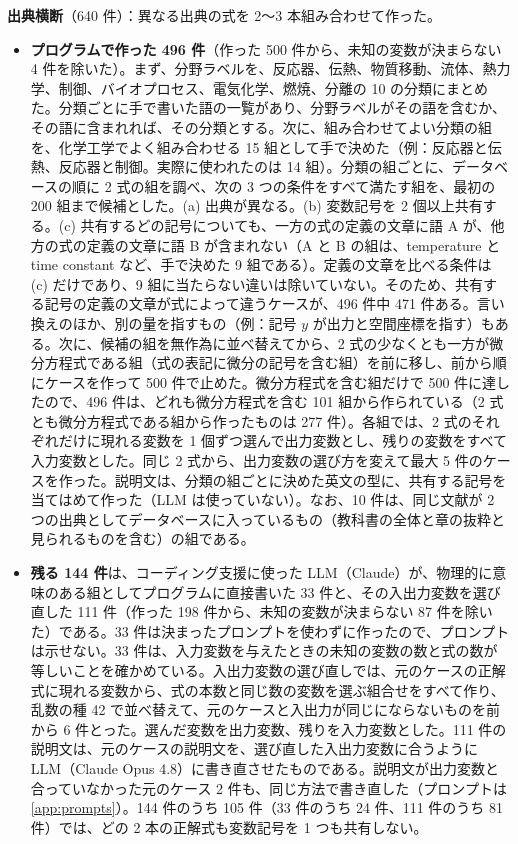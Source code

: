 \documentclass[11pt,a4paper]{ltjsarticle}
\begin{document}
\textbf{出典横断}（640 件）：異なる出典の式を 2〜3 本組み合わせて作った。
\begin{itemize}[leftmargin=1.5em]
  \item \textbf{プログラムで作った 496 件}（作った 500 件から、未知の変数が決まらない 4 件を除いた）。まず、分野ラベルを、反応器、伝熱、物質移動、流体、熱力学、制御、バイオプロセス、電気化学、燃焼、分離の 10 の分類にまとめた。分類ごとに手で書いた語の一覧があり、分野ラベルがその語を含むか、その語に含まれれば、その分類とする。次に、組み合わせてよい分類の組を、化学工学でよく組み合わせる 15 組として手で決めた（例：反応器と伝熱、反応器と制御。実際に使われたのは 14 組）。分類の組ごとに、データベースの順に 2 式の組を調べ、次の 3 つの条件をすべて満たす組を、最初の 200 組まで候補とした。(a) 出典が異なる。(b) 変数記号を 2 個以上共有する。(c) 共有するどの記号についても、一方の式の定義の文章に語 A が、他方の式の定義の文章に語 B が含まれない（A と B の組は、temperature と time constant など、手で決めた 9 組である）。定義の文章を比べる条件は (c) だけであり、9 組に当たらない違いは除いていない。そのため、共有する記号の定義の文章が式によって違うケースが、496 件中 471 件ある。言い換えのほか、別の量を指すもの（例：記号 $y$ が出力と空間座標を指す）もある。次に、候補の組を無作為に並べ替えてから、2 式の少なくとも一方が微分方程式である組（式の表記に微分の記号を含む組）を前に移し、前から順にケースを作って 500 件で止めた。微分方程式を含む組だけで 500 件に達したので、496 件は、どれも微分方程式を含む 101 組から作られている（2 式とも微分方程式である組から作ったものは 277 件）。各組では、2 式のそれぞれだけに現れる変数を 1 個ずつ選んで出力変数とし、残りの変数をすべて入力変数とした。同じ 2 式から、出力変数の選び方を変えて最大 5 件のケースを作った。説明文は、分類の組ごとに決めた英文の型に、共有する記号を当てはめて作った（LLM は使っていない）。なお、10 件は、同じ文献が 2 つの出典としてデータベースに入っているもの（教科書の全体と章の抜粋と見られるものを含む）の組である。
  \item \textbf{残る 144 件}は、コーディング支援に使った LLM（Claude）が、物理的に意味のある組としてプログラムに直接書いた 33 件と、その入出力変数を選び直した 111 件（作った 198 件から、未知の変数が決まらない 87 件を除いた）である。33 件は決まったプロンプトを使わずに作ったので、プロンプトは示せない。33 件は、入力変数を与えたときの未知の変数の数と式の数が等しいことを確かめている。入出力変数の選び直しでは、元のケースの正解式に現れる変数から、式の本数と同じ数の変数を選ぶ組合せをすべて作り、乱数の種 42 で並べ替えて、元のケースと入出力が同じにならないものを前から 6 件とった。選んだ変数を出力変数、残りを入力変数とした。111 件の説明文は、元のケースの説明文を、選び直した入出力変数に合うように LLM（Claude Opus 4.8）に書き直させたものである。説明文が出力変数と合っていなかった元のケース 2 件も、同じ方法で書き直した（プロンプトは\ref{app:prompts}）。144 件のうち 105 件（33 件のうち 24 件、111 件のうち 81 件）では、どの 2 本の正解式も変数記号を 1 つも共有しない。
\end{itemize}
\end{document}
